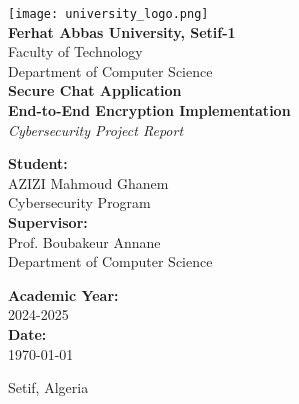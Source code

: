 \documentclass[12pt,a4paper]{article}
\begin{document}
\begin{titlepage}
    \centering
    \vspace*{1cm}

    \texttt{[image: university\_logo.png]}\\[1cm] %

    {\LARGE\textbf{Ferhat Abbas University, Setif-1}}\\[0.5cm]
    {\large Faculty of Technology}\\[0.3cm]
    {\large Department of Computer Science}\\[2cm]

    {\Huge\textbf{Secure Chat Application}}\\[0.5cm]
    {\Large\textbf{End-to-End Encryption Implementation}}\\[0.3cm]
    {\large\textit{Cybersecurity Project Report}}\\[3cm]

    \begin{minipage}{0.4\textwidth}
        \begin{flushleft}
            \textbf{Student:}\\
            AZIZI Mahmoud Ghanem\\
            Cybersecurity Program\\[1cm]

            \textbf{Supervisor:}\\
            Prof. Boubakeur Annane\\
            Department of Computer Science
        \end{flushleft}
    \end{minipage}
    \hfill
    \begin{minipage}{0.4\textwidth}
        \begin{flushright}
            \textbf{Academic Year:}\\
            2024-2025\\[1cm]

            \textbf{Date:}\\
            \today
        \end{flushright}
    \end{minipage}

    \vfill

    {\large Setif, Algeria}
\end{titlepage}

\tableofcontents
\newpage
\end{document}
